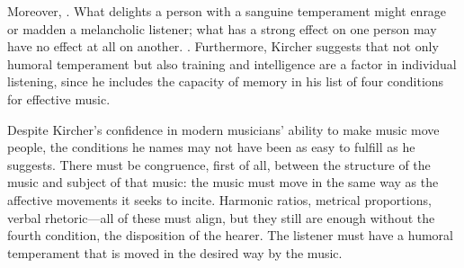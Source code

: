 Moreover, .%
    \Autocite
    [544: .]
    {Kircher:Musurgia}
What delights a person with a sanguine temperament might enrage or madden a
melancholic listener; what has a strong effect on one person may have no effect
at all on another.%
    \Autocite[550]{Kircher:Musurgia}
.%
    \Autocite
    [550: .]
    {Kircher:Musurgia}
Furthermore, Kircher suggests that not only humoral temperament but also
training and intelligence are a factor in individual listening, since he
includes the capacity of memory in his list of four conditions for effective
music.

Despite Kircher's confidence in modern musicians' ability to make music move
people, the conditions he names may not have been as easy to fulfill as he
suggests.
There must be congruence, first of all, between the structure of the music and
subject of that music: the music must move in the same way as the affective
movements it seeks to incite.
Harmonic ratios, metrical proportions, verbal rhetoric---all of these must
align, but they still are enough without the fourth condition, the disposition
of the hearer.
The listener must have a humoral temperament that is moved in the desired way by
the music.


